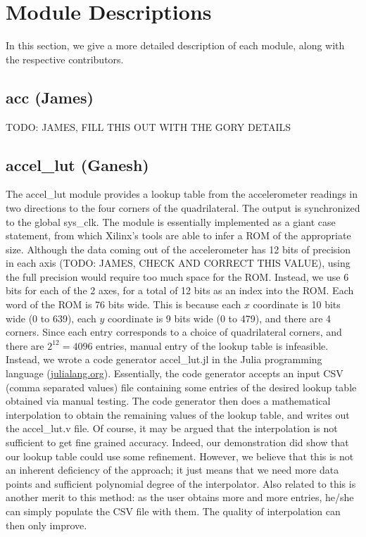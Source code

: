 \documentclass{article}
\begin{document}
\section{Module Descriptions}

In this section, we give a more detailed description of each module, along with the respective contributors.

\subsection{acc (James)}
TODO: JAMES, FILL THIS OUT WITH THE GORY DETAILS

\subsection{accel\_lut (Ganesh)}
The accel\_lut module provides a lookup table from the accelerometer readings in two directions to the four corners of the quadrilateral.
The output is synchronized to the global sys\_clk.
The module is essentially implemented as a giant case statement, from which Xilinx's tools are able to infer a ROM of the appropriate size.
Although the data coming out of the accelerometer has 12 bits of precision in each axis (TODO: JAMES, CHECK AND CORRECT THIS VALUE),
using the full precision would require too much space for the ROM.
Instead, we use 6 bits for each of the 2 axes, for a total of 12 bits as an index into the ROM.
Each word of the ROM is 76 bits wide.
This is because each $x$ coordinate is 10 bits wide (0 to 639), each $y$ coordinate is 9 bits wide (0 to 479), and there are 4 corners.
Since each entry corresponds to a choice of quadrilateral corners, and there are $2^{12} = 4096$ entries, manual entry of the lookup table is infeasible.
Instead, we wrote a code generator accel\_lut.jl in the Julia programming language (\url{julialang.org}).
Essentially, the code generator accepts an input CSV (comma separated values) file containing some entries of the desired lookup table obtained via manual testing.
The code generator then does a mathematical interpolation to obtain the remaining values of the lookup table, and writes out the accel\_lut.v file.
Of course, it may be argued that the interpolation is not sufficient to get fine grained accuracy.
Indeed, our demonstration did show that our lookup table could use some refinement.
However, we believe that this is not an inherent deficiency of the approach; it just means that we need more data points and sufficient polynomial degree of the interpolator.
Also related to this is another merit to this method: as the user obtains more and more entries,
he/she can simply populate the CSV file with them.
The quality of interpolation can then only improve.
\end{document}

